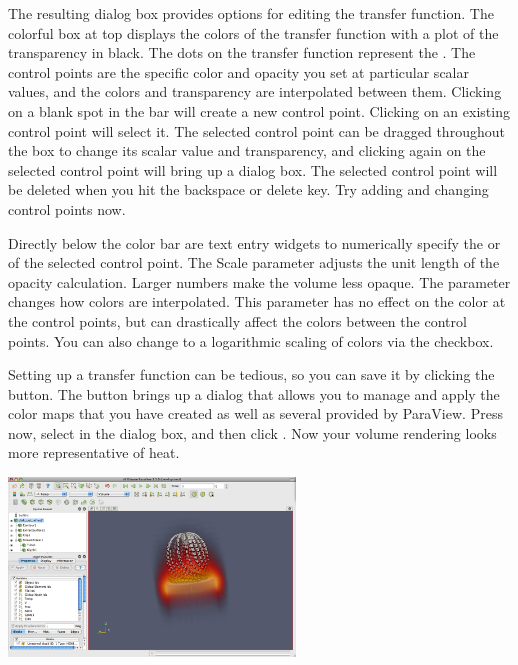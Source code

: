 The resulting dialog box provides options for editing the transfer
function.  The colorful box at top displays the colors of the transfer
function with a plot of the transparency in black.  The dots on the
transfer function represent the .  The control
points are the specific color and opacity you set at particular scalar
values, and the colors and transparency are interpolated between them.
Clicking on a blank spot in the bar will create a new control point.
Clicking on an existing control point will select it.  The selected control
point can be dragged throughout the box to change its scalar value and
transparency, and clicking again on the selected control point will bring
up a dialog box.  The selected control point will be deleted when you hit
the backspace or delete key.  Try adding and changing control points now.

Directly below the color bar are text entry widgets to numerically specify
the  or  of the selected control point.  The
Scale parameter adjusts the unit length of the opacity calculation.  Larger
numbers make the volume less opaque.  The  parameter
changes how colors are interpolated.  This parameter has no effect on the
color at the control points, but can drastically affect the colors between
the control points.  You can also change to a logarithmic scaling of colors
via the  checkbox.

Setting up a transfer function can be tedious, so you can save it by
clicking the  button.  The
 button brings up a
dialog that allows you to manage and apply the color maps that you have
created as well as several provided by ParaView.  Press
 now, select
 in the dialog box, and then click .  Now
your volume rendering looks more representative of heat.

\begin{inlinefig}
  \includegraphics[width=3in]{images/VolumeRender3}
\end{inlinefig}

